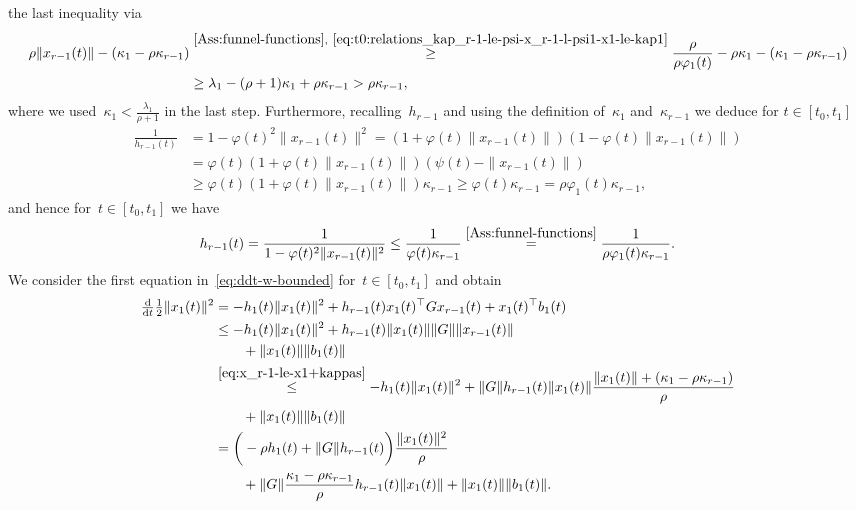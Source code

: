 \documentclass[ envcountsect, envcountsame]{svjour3}
\newcommand{\ddt}{\tfrac{\text{\normalfont d}}{\text{\normalfont d}t}}
\newcommand{\vp}{\varphi}
\begin{document}
the last inequality via
\begin{equation*}
\begin{aligned}
\rho \|x_{r-1}(t)\| - (\kappa_1 - \rho  \kappa_{r-1}) & \overset{\rm \ref{Ass:funnel-functions},~\eqref{eq:t0:relations_kap_r-1-le-psi-x_r-1-l-psi1-x1-le-kap1}}{\ge} 
 \frac{\rho}{\rho \vp_1(t)} - \rho \kappa_1 - (\kappa_1 - \rho  \kappa_{r-1}) \\
&\ge  \lambda_1 - (\rho + 1)\kappa_1 + \rho  \kappa_{r-1} > \rho  \kappa_{r-1}, 
\end{aligned}
\end{equation*}
where we used~$\kappa_1 < \tfrac{\lambda_1}{\rho+1}$ in the last step.
%
Furthermore, recalling~$h_{r-1}$ and using the definition of~$\kappa_1$ and~$ \kappa_{r-1}$ we deduce for $t \in [t_0,t_1]$
\begin{equation*} 
\begin{aligned}
\frac{1}{h_{r-1}(t)} &= 1- \vp(t)^2 \|x_{r-1}(t)\|^2 = (1+\vp(t)\|x_{r-1}(t)\|)(1-\vp(t)\|x_{r-1}(t)\|) \\
 & = \vp(t) (1+\vp(t) \|x_{r-1}(t)\|) (\psi(t) - \|x_{r-1}(t)\|) \\
 &\ge \vp(t) (1+\vp(t) \|x_{r-1}(t)\|)  \kappa_{r-1} \ge \vp(t)  \kappa_{r-1} = \rho \vp_1(t)  \kappa_{r-1} ,
\end{aligned}
\end{equation*}
and hence for~$t \in [t_0,t_1]$ we have
\begin{equation} \label{eq:h_r-1-le}
h_{r-1}(t) = \frac{1}{1 - \vp(t)^2 \|x_{r-1}(t)\|^2} \le \frac{1}{\vp(t)  \kappa_{r-1}} \overset{\rm \ref{Ass:funnel-functions}}{=} \frac{1}{\rho \vp_1(t)  \kappa_{r-1}}.
\end{equation}
%
We consider the first equation in~\eqref{eq:ddt-w-bounded} for~$t \in [t_0,  t_1]$ and obtain
\begin{equation*}
\begin{aligned}
\ddt \tfrac{1}{2} \|x_1(t)\|^2 &= -h_1(t) \|x_1(t)\|^2 + h_{r-1}(t) x_1(t)^\top Gx_{r-1}(t) + x_1(t)^\top b_1(t) \\
&\le -h_1(t) \| x_1(t)\|^2 + h_{r-1}(t) \|x_1(t)\| \|G\| \|x_{r-1}(t)\| \\
& \qquad + \|x_1(t)\| \|b_1(t)\| \\
& \overset{\eqref{eq:x_r-1-le-x1+kappas}}{\le} -h_1(t) \| x_1(t)\|^2 + \|G\| h_{r-1}(t) \| x_1(t)\| \frac{\|x_1(t)\| + (\kappa_1 - \rho  \kappa_{r-1})}{\rho}  \\
& \qquad + \|x_1(t)\| \|b_1(t)\| \\
& = \bigg( - \rho h_1(t) + \|G\| h_{r-1}(t) \bigg) \frac{\| x_1(t)\|^2}{\rho} \\
& \qquad + \|G\| \frac{\kappa_1 - \rho  \kappa_{r-1}}{\rho} h_{r-1}(t) \|x_1(t)\| + \|x_1(t)\| \|b_1(t)\| .
\end{aligned}
\end{equation*}
\end{document}
